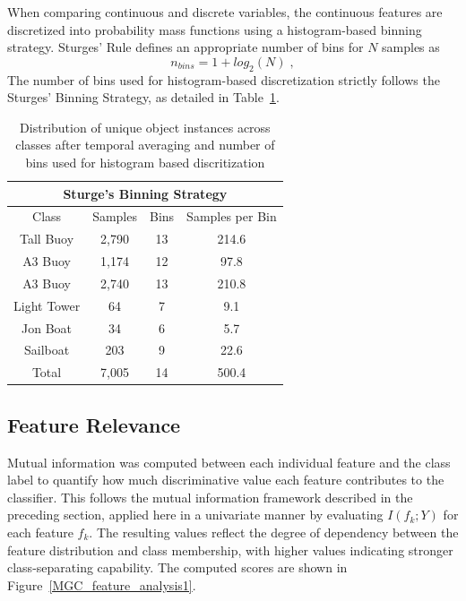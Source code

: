 \documentclass{erauthesis}
\begin{document}
When comparing continuous and discrete variables, the continuous features are discretized into probability mass functions using a histogram-based binning strategy. Sturges’ Rule \cite{sturges1926} defines an appropriate number of bins for $N$ samples as
\begin{equation}
    n_{bins} = 1+log_2(N)\;,
\end{equation}
The number of bins used for histogram-based discretization strictly follows the Sturges' Binning Strategy, as detailed in  Table~\ref{tbl:class_sample_sizes}. 

\begin{table}[h]
\centering
\begin{tabular}{cccc}
\hline
\multicolumn{4}{c}{Sturge's Binning Strategy} \\ \hline \hline
Class & Samples & Bins & Samples per Bin \\ \hline
Tall Buoy & 2,790 & 13 & 214.6 \\
A3 Buoy & 1,174 & 12 & 97.8 \\
A3 Buoy & 2,740 & 13 & 210.8 \\
Light Tower & 64 & 7 & 9.1 \\
Jon Boat & 34 & 6 & 5.7 \\
Sailboat & 203 & 9 & 22.6 \\ \hline
Total & 7,005 & 14 & 500.4 \\ 
\end{tabular}
\caption{Distribution of unique object instances across classes after temporal averaging and number of bins used for histogram based discritization}
\label{tbl:class_sample_sizes}
\end{table}

\subsection{Feature Relevance}

Mutual information was computed between each individual feature and the class label to quantify how much discriminative value each feature contributes to the classifier.
This follows the mutual information framework described in the preceding section, applied here in a univariate manner by evaluating $I(f_k; Y)$ for each feature $f_k$. The resulting values reflect the degree of dependency between the feature distribution and class membership, with higher values indicating stronger class-separating capability. The computed scores are shown in Figure~\ref{MGC_feature_analysis1}.
\end{document}
